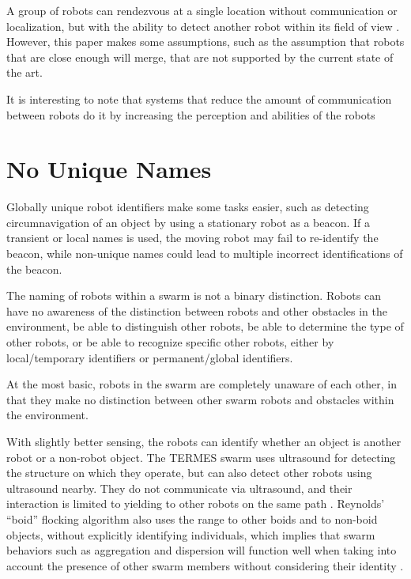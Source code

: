 \documentclass[]{article}
\begin{document}
A group of robots can rendezvous at a single location without communication or localization, but with the ability to detect another robot within its field of view \cite{yu2012rendezvous}. However, this paper makes some assumptions, such as the assumption that robots that are close enough will merge, that are not supported by the current state of the art. 

It is interesting to note that systems that reduce the amount of communication between robots do it by increasing the perception and abilities of the robots

\section{No Unique Names}

Globally unique robot identifiers make some tasks easier, such as detecting circumnavigation of an object by using a stationary robot as a beacon. 
If a transient or local names is used, the moving robot may fail to re-identify the beacon, while non-unique names could lead to multiple incorrect identifications of the beacon.


The naming of robots within a swarm is not a binary distinction. Robots can have no awareness of the distinction between robots and other obstacles in the environment, be able to distinguish other robots, be able to determine the type of other robots, or be able to recognize specific other robots, either by local/temporary identifiers or permanent/global identifiers. 

At the most basic, robots in the swarm are completely unaware of each other, in that they make no distinction between other swarm robots and obstacles within the environment. 

With slightly better sensing, the robots can identify whether an object is another robot or a non-robot object. The TERMES swarm uses ultrasound for detecting the structure on which they operate, but can also detect other robots using ultrasound nearby. They do not communicate via ultrasound, and their interaction is limited to yielding to other robots on the same path \cite{werfel2014designing}. Reynolds' ``boid'' flocking algorithm also uses the range to other boids and to non-boid objects, without explicitly identifying individuals, which implies that swarm behaviors such as aggregation and dispersion will function well when taking into account the presence of other swarm members without considering their identity \cite{reynolds1987flocks}. 
\end{document}
